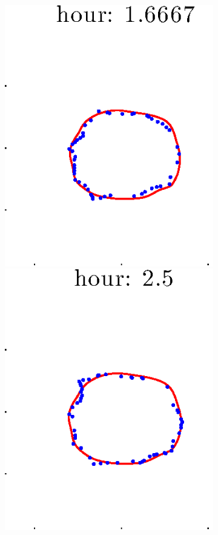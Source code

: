 \documentclass[12pt]{article}
\begin{document}
\begin{figure}[h!]
\begin{subfigure}[b]{.3\textwidth}
		\includegraphics[height=.15\textheight]{Pos10exp2/firsthalf/first3.eps}
		\includegraphics[height=.15\textheight]{Pos10exp2/firsthalf/first4.eps}

\end{subfigure}
\end{figure}
\end{document}
